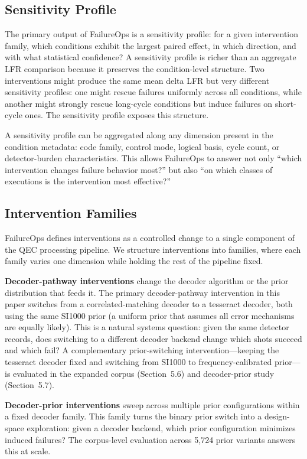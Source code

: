 \subsection{Sensitivity Profile}

The primary output of FailureOps is a sensitivity profile: for a given intervention family, which conditions exhibit the largest paired effect, in which direction, and with what statistical confidence? A sensitivity profile is richer than an aggregate LFR comparison because it preserves the condition-level structure. Two interventions might produce the same mean delta LFR but very different sensitivity profiles: one might rescue failures uniformly across all conditions, while another might strongly rescue long-cycle conditions but induce failures on short-cycle ones. The sensitivity profile exposes this structure.

A sensitivity profile can be aggregated along any dimension present in the condition metadata: code family, control mode, logical basis, cycle count, or detector-burden characteristics. This allows FailureOps to answer not only ``which intervention changes failure behavior most?'' but also ``on which classes of executions is the intervention most effective?''

\subsection{Intervention Families}

FailureOps defines interventions as a controlled change to a single component of the QEC processing pipeline. We structure interventions into families, where each family varies one dimension while holding the rest of the pipeline fixed.

\textbf{Decoder-pathway interventions} change the decoder algorithm or the prior distribution that feeds it. The primary decoder-pathway intervention in this paper switches from a correlated-matching decoder to a tesseract decoder, both using the same SI1000 prior (a uniform prior that assumes all error mechanisms are equally likely). This is a natural systems question: given the same detector records, does switching to a different decoder backend change which shots succeed and which fail? A complementary prior-switching intervention---keeping the tesseract decoder fixed and switching from SI1000 to frequency-calibrated prior---is evaluated in the expanded corpus (Section~5.6) and decoder-prior study (Section~5.7).

\textbf{Decoder-prior interventions} sweep across multiple prior configurations within a fixed decoder family. This family turns the binary prior switch into a design-space exploration: given a decoder backend, which prior configuration minimizes induced failures? The corpus-level evaluation across 5,724 prior variants answers this at scale.

